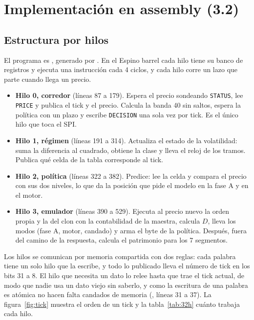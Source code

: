 \section{Implementación en assembly (3.2)}

\subsection{Estructura por hilos}

El programa es , generado por . En el Espino barrel cada hilo tiene su banco de registros y ejecuta una instrucción cada 4 ciclos, y cada hilo corre un lazo que parte cuando llega un precio.
\begin{itemize}
  \item \textbf{Hilo 0, corredor} (líneas 87 a 179). Espera el precio sondeando \texttt{STATUS}, lee \texttt{PRICE} y publica el tick y el precio. Calcula la banda 40 sin saltos, espera la política con un plazo y escribe \texttt{DECISION} una sola vez por tick. Es el único hilo que toca el SPI.
  \item \textbf{Hilo 1, régimen} (líneas 191 a 314). Actualiza el estado de la volatilidad: suma la diferencia al cuadrado, obtiene la clase y lleva el reloj de los tramos. Publica qué celda de la tabla corresponde al tick.
  \item \textbf{Hilo 2, política} (líneas 322 a 382). Predice: lee la celda y compara el precio con sus dos niveles, lo que da la posición que pide el modelo en la fase A y en el motor.
  \item \textbf{Hilo 3, emulador} (líneas 390 a 529). Ejecuta al precio nuevo la orden propia y la del clon con la contabilidad de la maestra, calcula $D$, lleva los modos (fase A, motor, candado) y arma el byte de la política. Después, fuera del camino de la respuesta, calcula el patrimonio para los 7 segmentos.
\end{itemize}

Los hilos se comunican por memoria compartida con dos reglas: cada palabra tiene un solo hilo que la escribe, y todo lo publicado lleva el número de tick en los bits 31 a 8. El hilo que necesita un dato lo relee hasta que trae el tick actual, de modo que nadie usa un dato viejo sin saberlo, y como la escritura de una palabra es atómica no hacen falta candados de memoria (, líneas 31 a 37). La figura~\ref{fig:tick} muestra el orden de un tick y la tabla~\ref{tab:32h} cuánto trabaja cada hilo.

